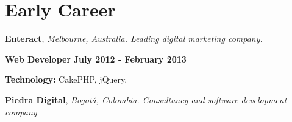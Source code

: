 

\section{Early Career}
%
\textbf{Enteract},
\textit{Melbourne, Australia. Leading digital marketing company.}

\begin{outerlist}
\item[\FA \faAngleDoubleRight] \textbf{Web Developer} \hfill
\textbf{July 2012 - February 2013}
\end{outerlist}
% 
    \begin{innerlist}
\item \textbf{Technology:} CakePHP, jQuery.
    \end{innerlist}

\quarterblankline

\textbf{Piedra Digital},
\textit{Bogot\'a, Colombia. Consultancy and software development
company}

